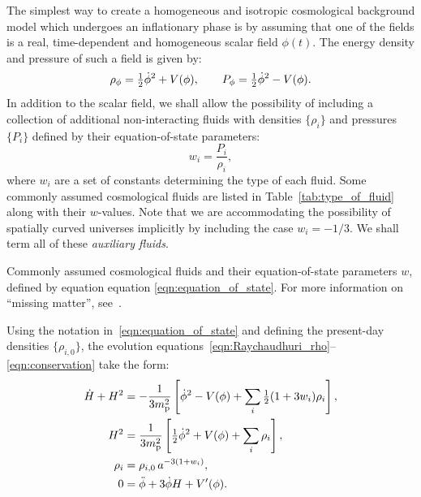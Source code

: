 The simplest way to create a homogeneous and isotropic cosmological background model which undergoes an inflationary phase is by assuming that one of the fields is a real, time-dependent and homogeneous scalar field \(\phi(t)\). The energy density and pressure of such a field is given by:
\begin{equation}
  \rho_\phi = {\textstyle\frac{1}{2}}\dot{\phi}^2+V(\phi),
  \qquad
  P_\phi = {\textstyle\frac{1}{2}}\dot{\phi}^2-V(\phi).
  \label{eqn:rhopdef}
\end{equation}
In addition to the scalar field, we shall allow the possibility of including a collection of additional non-interacting fluids with densities \(\{\rho_i\}\) and pressures \(\{P_i\}\) defined by their equation-of-state parameters:
\begin{equation}
  w_i =\frac{P_i}{\rho_i},
  \label{eqn:equation_of_state}
\end{equation}
where \({w_i}\) are a set of constants determining the type of each fluid. Some commonly assumed cosmological fluids are listed in Table~\ref{tab:type_of_fluid} along with their \(w\)-values. Note that we are accommodating the possibility of spatially curved universes implicitly by including the case \(w_i=-1/3\). We shall term all of these {\em auxiliary fluids}.
\begin{table}[tp]
  \centering
  
  \caption{Commonly assumed cosmological fluids and their equation-of-state parameters \(w\), defined by equation equation \protect\eqref{eqn:equation_of_state}.  For more information on ``missing matter'', see~\protect\cite{vazquez_2012}.}\label{tab:type_of_fluid}
\end{table}

Using the notation in~\eqref{eqn:equation_of_state} and defining the present-day densities \(\{\rho_{i,0}\}\), the evolution equations~\eqref{eqn:Raychaudhuri_rho}--\eqref{eqn:conservation} take the form:
\begin{align}
  \dot{H}+H^2 &= 
  -\frac{1}{3m_{\mathrm{p}}^2}\left[\dot{\phi}^2 - V(\phi) +
  \sum_i{\textstyle\frac{1}{2}}(1+3w_i)\rho_i\right] ,
  \label{eqn:Raychaudhuri_mod}
  \\
  H^2 &= 
  \frac{1}{3m_{\mathrm{p}}^2}\left[{\textstyle\frac{1}{2}}\dot{\phi}^2 + V(\phi) +
  \sum_i\rho_i\right],
  \label{eqn:Friedmann_mod} 
  \\
  \rho_i &= 
  \rho_{i,0} \,a^{-3(1+w_i)},
  \label{eqn:rho_a} 
  \\ 
  0&= 
  \ddot{\phi} +3\dot{\phi}H + V^\prime(\phi).
  \label{eqn:Klein_Gordon_mod}
\end{align}


